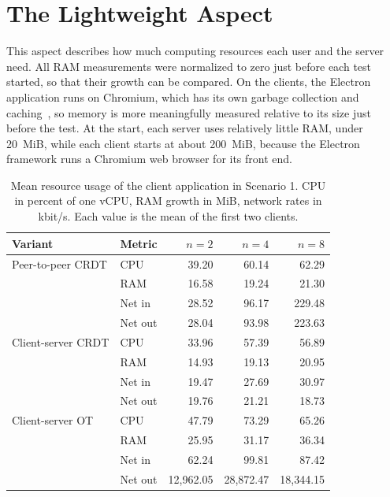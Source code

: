 \section{The Lightweight Aspect}
\label{sec:5:lightweight}

This aspect describes how much computing resources each user and the server need. All RAM measurements were normalized to zero just before each test started, so that their growth can be compared. On the clients, the Electron application runs on Chromium, which has its own garbage collection and caching~\citep{chromium}, so memory is more meaningfully measured relative to its size just before the test. At the start, each server uses relatively little RAM, under 20~MiB, while each client starts at about 200~MiB, because the Electron framework runs a Chromium web browser for its front end.

\begin{table}[htbp]
 \centering
 \caption[Mean resource usage of the client application in Scenario 1]{Mean resource usage of the client application in Scenario 1. CPU in percent of one vCPU, RAM growth in MiB, network rates in kbit/s. Each value is the mean of the first two clients.}
 \label{tab:resource-client-1}
 \begin{tabular}{@{}llrrr@{}}
 \toprule
 \textbf{Variant} & \textbf{Metric} & $n = 2$ & $n = 4$ & $n = 8$ \\
 \midrule
 Peer-to-peer CRDT & CPU     & 39.20     & 60.14     & 62.29 \\
                   & RAM     & 16.58     & 19.24     & 21.30 \\
                   & Net in  & 28.52     & 96.17     & 229.48 \\
                   & Net out & 28.04  & 93.98  & 223.63 \\
 \midrule
 Client-server CRDT & CPU     & 33.96    & 57.39     & 56.89 \\
                    & RAM     & 14.93    & 19.13     & 20.95 \\
                    & Net in  & 19.47    & 27.69     & 30.97 \\
                    & Net out & 19.76 & 21.21  & 18.73 \\
 \midrule
 Client-server OT & CPU     & 47.79       & 73.29       & 65.26 \\
                  & RAM     & 25.95       & 31.17       & 36.34 \\
                  & Net in  & 62.24       & 99.81       & 87.42 \\
                  & Net out & 12{,}962.05 & 28{,}872.47 & 18{,}344.15 \\
 \bottomrule
 \end{tabular}
\end{table}

